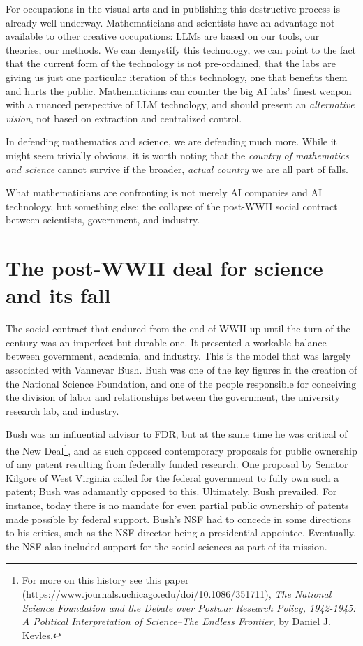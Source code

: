 \documentclass[11pt]{amsart}
\begin{document}
For occupations in the visual arts and in publishing this destructive process is already well underway. Mathematicians and scientists have an advantage not available to other creative occupations: LLMs are based on our tools, our theories, our methods. We can demystify this technology, we can point to the fact that the current form of the technology is not pre-ordained, that the labs are giving us just one particular iteration of this technology, one that benefits them and hurts the public. Mathematicians can counter the big AI labs' finest weapon with a nuanced perspective of LLM technology, and should present an \emph{alternative vision}, not based on extraction and centralized control.

In defending mathematics and science, we are defending much more. While it might seem trivially obvious, it is worth noting that the \emph{country of mathematics and science} cannot survive if the broader, \emph{actual country} we are all part of falls.

What mathematicians are confronting is not merely AI companies and AI technology, but something else: the collapse of the post-WWII social contract between scientists, government, and industry.

\section{The post-WWII deal for science and its fall}

The social contract that endured from the end of WWII up until the turn of the century was an imperfect but durable one. It presented a workable balance between government, academia, and industry. This is the model that was largely associated with Vannevar Bush. Bush was one of the key figures in the creation of the National Science Foundation, and one of the people responsible for conceiving the division of labor and relationships between the government, the university research lab, and industry.

Bush was an influential advisor to FDR, but at the same time he was critical of the New Deal\footnote{For more on this history see \href{https://www.journals.uchicago.edu/doi/10.1086/351711}{this paper} (\url{https://www.journals.uchicago.edu/doi/10.1086/351711}), \emph{The National Science Foundation and the Debate over Postwar Research Policy, 1942-1945: A Political Interpretation of Science--The Endless Frontier}, by Daniel J. Kevles.}, and as such opposed contemporary proposals for public ownership of any patent resulting from federally funded research. One proposal by Senator Kilgore of West Virginia called for the federal government to fully own such a patent; Bush was adamantly opposed to this. Ultimately, Bush prevailed. For instance, today there is no mandate for even partial public ownership of patents made possible by federal support. Bush's NSF had to concede in some directions to his critics, such as the NSF director being a presidential appointee. Eventually, the NSF also included support for the social sciences as part of its mission.
\end{document}
